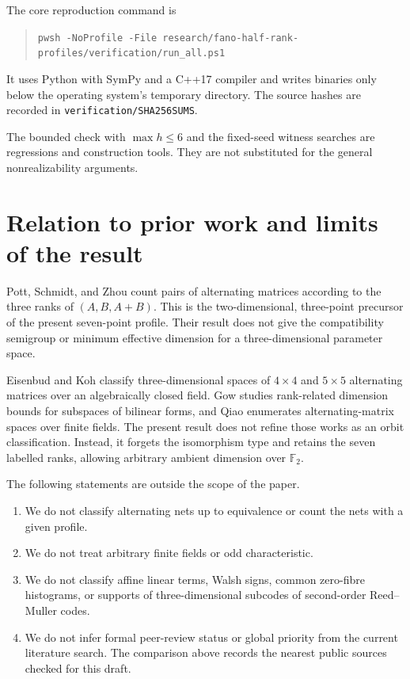 \documentclass[11pt]{article}
\theoremstyle{remark}
\numberwithin{equation}{section}
\begin{document}
The core reproduction command is

\begin{quote}\small\raggedright
\texttt{pwsh -NoProfile -File research/\allowbreak{}fano-half-rank-profiles/\allowbreak{}verification/\allowbreak{}run\_\allowbreak{}all.ps1}\par
\end{quote}


It uses Python with SymPy and a C++17 compiler and writes binaries only below
the operating system's temporary directory. The source hashes are recorded in
\nolinkurl{verification/SHA256SUMS}.

The bounded check with $\max h\le6$ and the fixed-seed witness searches are
regressions and construction tools. They are not substituted for the general
nonrealizability arguments.

\section{Relation to prior work and limits of the result}


Pott, Schmidt, and Zhou \cite{pott2016} count pairs of alternating matrices according to the
three ranks of $(A,B,A+B)$. This is the two-dimensional, three-point precursor
of the present seven-point profile. Their result does not give the compatibility
semigroup or minimum effective dimension for a three-dimensional parameter
space.

Eisenbud and Koh \cite{eisenbud1994} classify three-dimensional spaces of $4\times4$ and
$5\times5$ alternating matrices over an algebraically closed field. Gow \cite{gow2017}
studies rank-related dimension bounds for subspaces of bilinear forms, and Qiao
\cite{qiao2021} enumerates alternating-matrix spaces over finite fields. The present result
does not refine those works as an orbit classification. Instead, it forgets the
isomorphism type and retains the seven labelled ranks, allowing arbitrary
ambient dimension over $\mathbb F_2$.

The following statements are outside the scope of the paper.

\begin{enumerate}
\item We do not classify alternating nets up to equivalence or count the nets with
   a given profile.
\item We do not treat arbitrary finite fields or odd characteristic.
\item We do not classify affine linear terms, Walsh signs, common zero-fibre
   histograms, or supports of three-dimensional subcodes of second-order
   Reed--Muller codes.
\item We do not infer formal peer-review status or global priority from the current
   literature search. The comparison above records the nearest public sources
   checked for this draft.

\end{enumerate}
\end{document}
